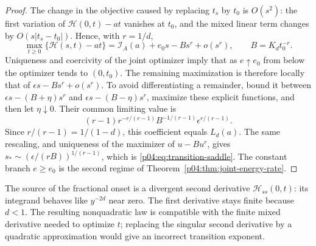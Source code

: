 \documentclass[11pt,letterpaper]{article}
\theoremstyle{definition}
\theoremstyle{remark}
\newcommand{\1}{\mathbf 1}
\begin{document}
\begin{proof}
The change in the objective caused by replacing $t_s$ by $t_0$
is $O(s^2)$: the first variation of
$\mathcal H(0,t)-at$ vanishes at $t_0$, and the mixed linear
term changes by $O(s|t_s-t_0|)$. Hence, with $r=1/d$,
\begin{equation}\label{p04:eq:reduced-axis-expansion}
 \max_{t\ge0}\{\mathcal H(s,t)-at\}
 =\mathcal I_A(a)+e_0s-Bs^r+o(s^r),
 \qquad B=K_dt_0^{-r}.
\end{equation}
Uniqueness and coercivity of the joint optimizer imply that as
$e\uparrow e_0$ from below the optimizer tends to $(0,t_0)$.
The remaining maximization is therefore locally that of
$\epsilon s-Bs^r+o(s^r)$. To avoid differentiating a remainder,
bound it between $\epsilon s-(B+\eta)s^r$ and
$\epsilon s-(B-\eta)s^r$, maximize these explicit functions,
and then let $\eta\downarrow0$. Their common limiting value is
\[
 (r-1)r^{-r/(r-1)}B^{-1/(r-1)}
              \epsilon^{r/(r-1)}.
\]
Since $r/(r-1)=1/(1-d)$, this coefficient equals $L_d(a)$.
The same rescaling, and uniqueness of the maximizer of
$u-Bu^r$, gives
$s_*\sim(\epsilon/(rB))^{1/(r-1)}$, which is
\eqref{p04:eq:transition-saddle}. The constant branch $e\ge e_0$
is the second regime of Theorem~\ref{p04:thm:joint-energy-rate}.
\end{proof}

The source of the fractional onset is a divergent second derivative
$\mathcal H_{ss}(0,t)$: its integrand behaves like $y^{-2d}$
near zero. The first derivative stays finite because $d<1$.
The resulting nonquadratic law is compatible with the finite
mixed derivative needed to optimize $t$; replacing the singular
second derivative by a quadratic approximation would give an
incorrect transition exponent.
\end{document}
